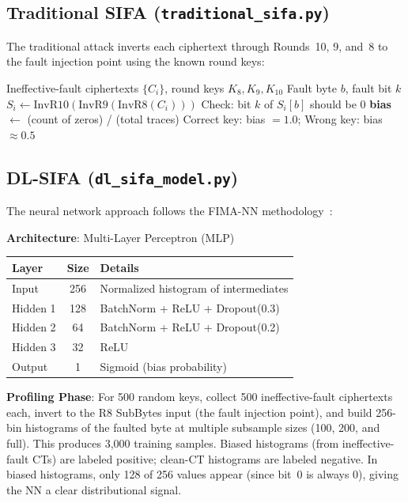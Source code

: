 \documentclass[11pt,a4paper]{article}
\begin{document}
\subsection{Traditional SIFA (\texttt{traditional\_sifa.py})}

The traditional attack inverts each ciphertext through Rounds~10, 9, and~8 to the fault injection point using the known round keys:

\begin{algorithm}[H]
\caption{Traditional SIFA Bit-Bias Distinguisher}
\begin{algorithmic}[1]
\Require Ineffective-fault ciphertexts $\{C_i\}$, round keys $K_8, K_9, K_{10}$
\Require Fault byte $b$, fault bit $k$
    \State $S_i \gets \text{InvR10}(\text{InvR9}(\text{InvR8}(C_i)))$
    \State Check: bit $k$ of $S_i[b]$ should be 0
\EndFor
\State \textbf{bias} $\gets$ (count of zeros) / (total traces)
\State Correct key: bias $= 1.0$; Wrong key: bias $\approx 0.5$
\end{algorithmic}
\end{algorithm}

\subsection{DL-SIFA (\texttt{dl\_sifa\_model.py})}

The neural network approach follows the FIMA-NN methodology~\cite{ramezanpour2019}:

\textbf{Architecture}: Multi-Layer Perceptron (MLP)
\begin{center}
\begin{tabular}{lcl}
\toprule
\textbf{Layer} & \textbf{Size} & \textbf{Details} \\
\midrule
Input & 256 & Normalized histogram of intermediates \\
Hidden 1 & 128 & BatchNorm + ReLU + Dropout(0.3) \\
Hidden 2 & 64 & BatchNorm + ReLU + Dropout(0.2) \\
Hidden 3 & 32 & ReLU \\
Output & 1 & Sigmoid (bias probability) \\
\bottomrule
\end{tabular}
\end{center}

\textbf{Profiling Phase}: For 500 random keys, collect 500 ineffective-fault ciphertexts each, invert to the R8 SubBytes input (the fault injection point), and build 256-bin histograms of the faulted byte at multiple subsample sizes (100, 200, and full). This produces 3,000 training samples. Biased histograms (from ineffective-fault CTs) are labeled positive; clean-CT histograms are labeled negative. In biased histograms, only 128 of 256 values appear (since bit~0 is always 0), giving the NN a clear distributional signal.
\end{document}
